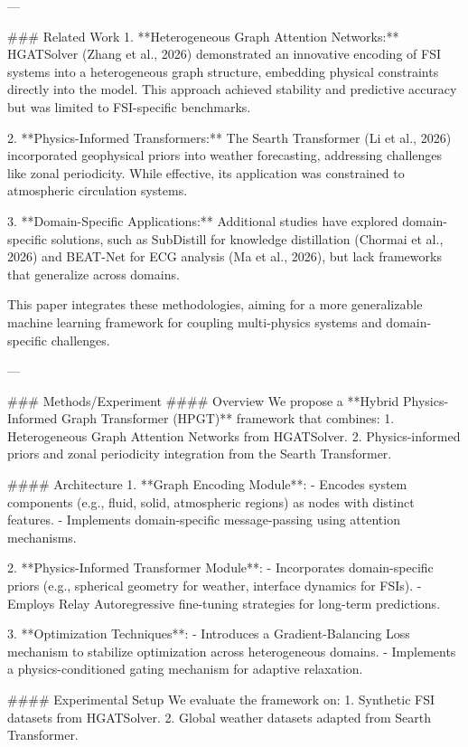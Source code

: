---

### Related Work
1. **Heterogeneous Graph Attention Networks:** HGATSolver (Zhang et al., 2026) demonstrated an innovative encoding of FSI systems into a heterogeneous graph structure, embedding physical constraints directly into the model. This approach achieved stability and predictive accuracy but was limited to FSI-specific benchmarks.
   
2. **Physics-Informed Transformers:** The Searth Transformer (Li et al., 2026) incorporated geophysical priors into weather forecasting, addressing challenges like zonal periodicity. While effective, its application was constrained to atmospheric circulation systems.

3. **Domain-Specific Applications:** Additional studies have explored domain-specific solutions, such as SubDistill for knowledge distillation (Chormai et al., 2026) and BEAT-Net for ECG analysis (Ma et al., 2026), but lack frameworks that generalize across domains.

This paper integrates these methodologies, aiming for a more generalizable machine learning framework for coupling multi-physics systems and domain-specific challenges.

---

### Methods/Experiment
#### Overview
We propose a **Hybrid Physics-Informed Graph Transformer (HPGT)** framework that combines:
1. Heterogeneous Graph Attention Networks from HGATSolver.
2. Physics-informed priors and zonal periodicity integration from the Searth Transformer.

#### Architecture
1. **Graph Encoding Module**:
   - Encodes system components (e.g., fluid, solid, atmospheric regions) as nodes with distinct features.
   - Implements domain-specific message-passing using attention mechanisms.

2. **Physics-Informed Transformer Module**:
   - Incorporates domain-specific priors (e.g., spherical geometry for weather, interface dynamics for FSIs).
   - Employs Relay Autoregressive fine-tuning strategies for long-term predictions.

3. **Optimization Techniques**:
   - Introduces a Gradient-Balancing Loss mechanism to stabilize optimization across heterogeneous domains.
   - Implements a physics-conditioned gating mechanism for adaptive relaxation.

#### Experimental Setup
We evaluate the framework on:
1. Synthetic FSI datasets from HGATSolver.
2. Global weather datasets adapted from Searth Transformer.

